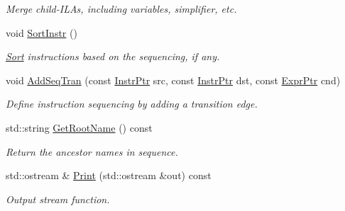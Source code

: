 \begin{DoxyCompactItemize}
\begin{DoxyCompactList}\small\item\em Merge child-\/\+I\+L\+As, including variables, simplifier, etc. \end{DoxyCompactList}\item 
\mbox{\label{classilang_1_1_instr_lvl_abs_a0755b8367a970c7d639ab3e3589f747f}} 
void \mbox{\hyperlink{classilang_1_1_instr_lvl_abs_a0755b8367a970c7d639ab3e3589f747f}{Sort\+Instr}} ()
\begin{DoxyCompactList}\small\item\em \mbox{\hyperlink{classilang_1_1_sort}{Sort}} instructions based on the sequencing, if any. \end{DoxyCompactList}\item 
void \mbox{\hyperlink{classilang_1_1_instr_lvl_abs_a16aac64c463f751d34f38986ad60b0f1}{Add\+Seq\+Tran}} (const \mbox{\hyperlink{namespaceilang_af88a19312ae653d687a0d1207bb284f6}{Instr\+Ptr}} src, const \mbox{\hyperlink{namespaceilang_af88a19312ae653d687a0d1207bb284f6}{Instr\+Ptr}} dst, const \mbox{\hyperlink{namespaceilang_a7c4196c72e53ea4df4b7861af7bc3bce}{Expr\+Ptr}} cnd)
\begin{DoxyCompactList}\small\item\em Define instruction sequencing by adding a transition edge. \end{DoxyCompactList}\item 
\mbox{\label{classilang_1_1_instr_lvl_abs_aa371603de31e6497151877de19576256}} 
std\+::string \mbox{\hyperlink{classilang_1_1_instr_lvl_abs_aa371603de31e6497151877de19576256}{Get\+Root\+Name}} () const
\begin{DoxyCompactList}\small\item\em Return the ancestor names in sequence. \end{DoxyCompactList}\item 
\mbox{\label{classilang_1_1_instr_lvl_abs_accd2996b07654ffa2ee95258752f05b2}} 
std\+::ostream \& \mbox{\hyperlink{classilang_1_1_instr_lvl_abs_accd2996b07654ffa2ee95258752f05b2}{Print}} (std\+::ostream \&out) const
\begin{DoxyCompactList}\small\item\em Output stream function. \end{DoxyCompactList}\item 

\end{DoxyCompactItemize}
